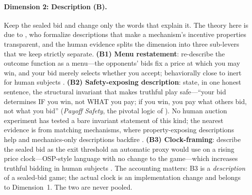 \paragraph{Dimension 2: Description (B).}
Keep the sealed bid and change only the words that explain it. The theory here is due to \citet{gonczarowski2023strategyproofness}, who formalize descriptions that make a mechanism's incentive properties transparent, and the human evidence splits the dimension into three sub-levers that we keep strictly separate. \textbf{(B1) Menu restatement}: re-describe the outcome function as a menu---the opponents' bids fix a price at which you may win, and your bid merely selects whether you accept; behaviorally close to inert for human subjects \citep{gonczarowski2023strategyproofness, gonczarowski2024describing}. \textbf{(B2) Safety-exposing description}: state, in one honest sentence, the structural invariant that makes truthful play safe---``your bid determines IF you win, not WHAT you pay; if you win, you pay what others bid, not what you bid'' (\emph{Payoff Safety}, the pivotal logic of \citealp{vickrey1961counterspeculation}). No human auction experiment has tested a bare invariant statement of this kind; the nearest evidence is from matching mechanisms, where property-exposing descriptions help and mechanics-only descriptions backfire \citep{gonczarowski2024describing, katuscak2024simpler, guillen2018effectiveness}. \textbf{(B3) Clock-framing}: describe the sealed bid as the exit threshold an automatic proxy would use on a rising price clock---OSP-style language with no change to the game---which increases truthful bidding in human subjects \citep{breitmoser2022obviousness}. The accounting matters: B3 is a \emph{description} of a sealed-bid game; the actual clock is an implementation change and belongs to Dimension~1. The two are never pooled.

